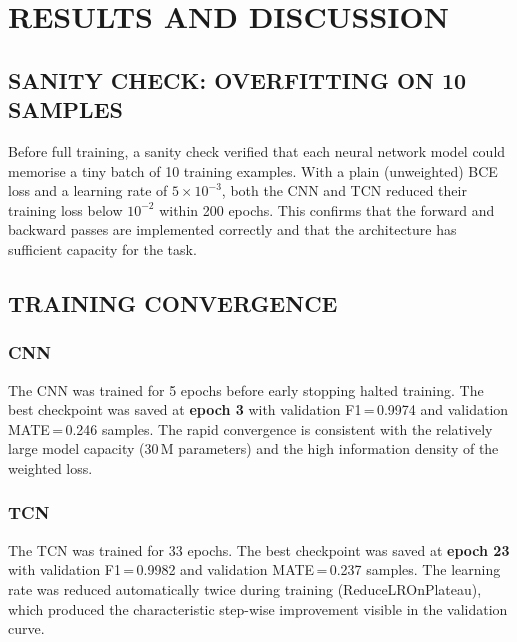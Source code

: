 \chapter{RESULTS AND DISCUSSION}

\section{SANITY CHECK: OVERFITTING ON 10 SAMPLES}

Before full training, a sanity check verified that each neural network model
could memorise a tiny batch of 10 training examples. With a plain (unweighted)
BCE loss and a learning rate of $5 \times 10^{-3}$, both the CNN and TCN reduced
their training loss below $10^{-2}$ within 200 epochs. This confirms that the
forward and backward passes are implemented correctly and that the architecture
has sufficient capacity for the task.

\section{TRAINING CONVERGENCE}

\subsection{CNN}

The CNN was trained for 5 epochs before early stopping halted training. The best
checkpoint was saved at \textbf{epoch 3} with validation F1\,=\,0.9974 and
validation MATE\,=\,0.246 samples. The rapid convergence is consistent with the
relatively large model capacity (30\,M parameters) and the high information
density of the weighted loss.


\subsection{TCN}

The TCN was trained for 33 epochs. The best checkpoint was saved at
\textbf{epoch 23} with validation F1\,=\,0.9982 and validation
MATE\,=\,0.237 samples. The learning rate was reduced automatically twice during
training (ReduceLROnPlateau), which produced the characteristic step-wise
improvement visible in the validation curve.

